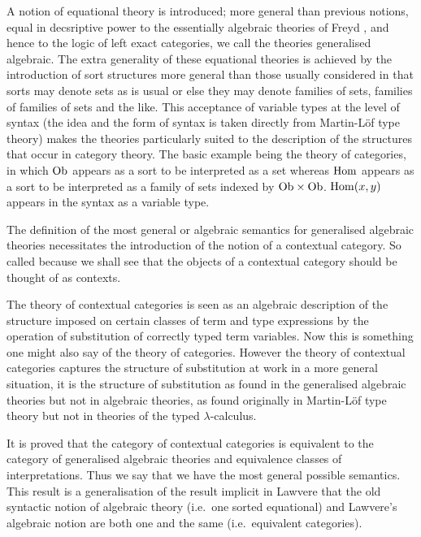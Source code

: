 
A notion of equational theory is introduced; more general than previous notions, equal in decsriptive power to the essentially algebraic theories of Freyd \cite{freyd:aspects-of-topoi}, and hence to the logic of left exact categories, we call the theories generalised algebraic.
%
The extra generality of these equational theories is achieved by the introduction of sort structures more general than those usually considered in that sorts may denote sets as is usual or else they may denote families of sets, families of families of sets and the like.
%
This acceptance of variable types at the level of syntax (the idea and the form of syntax is taken directly from Martin-Löf type theory) makes the theories particularly suited to the description of the structures that occur in category theory.
%
The basic example being the theory of categories, in which $\mathrm{Ob}$ appears as a sort to be interpreted as a set whereas $\mathrm{Hom}$ appears as a sort to be interpreted as a family of sets indexed by $\mathrm{Ob} \times \mathrm{Ob}$.
%
$\mathrm{Hom}(x,y)$ appears in the syntax as a variable type.

The definition of the most general or algebraic semantics for generalised algebraic theories necessitates the introduction of the notion of a contextual category.
%
So called because we shall see that the objects of a contextual category should be thought of as contexts.

The theory of contextual categories is seen as an algebraic description of the structure imposed on certain classes of term and type expressions by the operation of substitution of correctly typed term variables.
%
Now this is something one might also say of the theory of categories.
%
However the theory of contextual categories captures the structure of substitution at work in a more general situation, it is the structure of substitution as found in the generalised algebraic theories but not in algebraic theories, as found originally in Martin-Löf type theory but not in theories of the typed $\lambda$-calculus.

It is proved that the category of contextual categories is equivalent to the category of generalised algebraic theories and equivalence classes of interpretations.
%
Thus we say that we have the most general possible semantics.
%
This result is a generalisation of the result implicit in Lawvere \cite{lawvere:11} that the old syntactic notion of algebraic theory (i.e.\ one sorted equational) and Lawvere's algebraic notion are both one and the same (i.e.\ equivalent categories).

